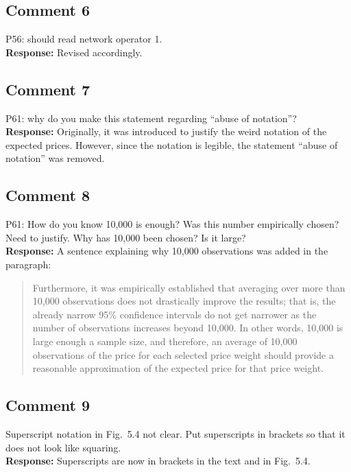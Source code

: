 \documentclass[10pt,a4paper,notitlepage]{article}
\numberwithin{equation}{section}
\begin{document}
\subsection{Comment 6}
P56: should read network operator 1.\\[-2ex]

\textbf{Response:}
Revised accordingly.

\subsection{Comment 7}
P61: why do you make this statement regarding ``abuse of notation''?\\[-2ex]

\textbf{Response:}
Originally, it was introduced to justify the weird notation of the expected prices. However, since the notation is legible, the statement ``abuse of notation'' was removed.

\subsection{Comment 8}
P61: How do you know 10,000 is enough? Was this number empirically chosen? Need to justify. Why has 10,000 been chosen? Is it large?\\[-2ex]

\textbf{Response:}
A sentence explaining why 10,000 observations was added in the paragraph:
\begin{quote}
Furthermore, it was empirically established that averaging over more than 10,000 observations does not drastically improve the results; that is, the already narrow 95\% confidence intervals do not get narrower as the number of observations increases beyond 10,000. In other words, 10,000 is large enough a sample size, and therefore, an average of 10,000 observations of the price for each selected price weight should provide a reasonable approximation of the expected price for that price weight.
\end{quote}

\subsection{Comment 9}
Superscript notation in Fig.~5.4 not clear. Put superscripts in brackets so that it does not look like squaring.\\[-2ex]

\textbf{Response:}
Superscripts are now in brackets in the text and in Fig.~5.4.
\end{document}
